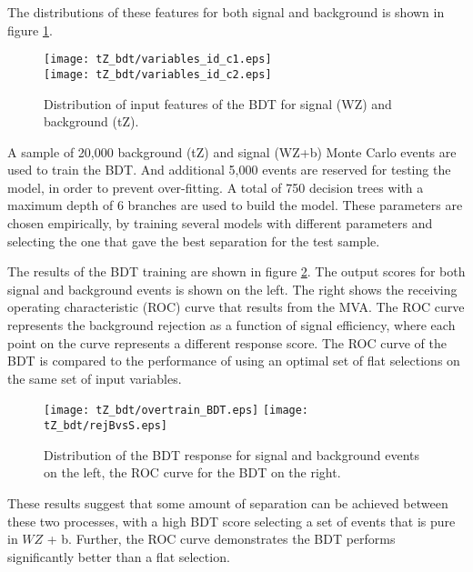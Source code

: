 The distributions of these features for both signal and background is shown in figure \ref{fig:tZ_kinematics}.
 
\begin{figure}[H]
\center
    \texttt{[image: tZ\_bdt/variables\_id\_c1.eps]}\\
    \texttt{[image: tZ\_bdt/variables\_id\_c2.eps]}\\
    \caption{Distribution of input features of the BDT for signal (WZ) and background (tZ).}
    \label{fig:tZ_kinematics}
\end{figure}

A sample of 20,000 background (tZ) and signal (WZ+b) Monte Carlo events are used to train the BDT. And additional 5,000 events are reserved for testing the model, in order to prevent over-fitting. A total of 750 decision trees with a maximum depth of 6 branches are used to build the model. These parameters are chosen empirically, by training several models with different parameters and selecting the one that gave the best separation for the test sample. 

The results of the BDT training are shown in figure \ref{fig:tZ_bdt}. The output scores for both signal and background events is shown on the left. The right shows the receiving operating characteristic (ROC) curve that results from the MVA. The ROC curve represents the background rejection as a function of signal efficiency, where each point on the curve represents a different response score. The ROC curve of the BDT is compared to the performance of using an optimal set of flat selections on the same set of input variables.

\begin{figure}[H]
\center
    \texttt{[image: tZ\_bdt/overtrain\_BDT.eps]}%
    \texttt{[image: tZ\_bdt/rejBvsS.eps]}\\
    \caption{Distribution of the BDT response for signal and background events on the left, the ROC curve for the BDT on the right.}
    \label{fig:tZ_bdt}
\end{figure}

These results suggest that some amount of separation can be achieved between these two processes, with a high BDT score selecting a set of events that is pure in $WZ$ + b. Further, the ROC curve demonstrates the BDT performs significantly better than a flat selection.

